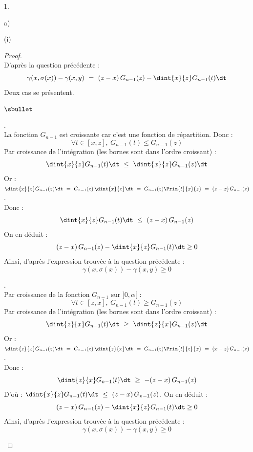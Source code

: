 \documentclass[11pt]{article}%
\begin{document}
\begin{noliste}{1.}
\begin{noliste}{a)}
\begin{nonoliste}{(i)}
      \begin{proof}~\\
      D'après la question précédente :
      \[
        \gamma(x, \sigma(x)) - \gamma(x,y) \ = \
        (z-x) \, G_{n-1}(z) - \dint{x}{z} G_{n-1}(t) \dt
      \]
      Deux cas se présentent.
        \begin{noliste}{$\sbullet$}
	  \item {}.\\
	  La fonction $G_{n-1}$ est croissante car c'est une fonction
	  de répartition. Donc :
	  \[
	    \forall t \in [x,z], \ G_{n-1}(t) \leq G_{n-1}(z)
	  \]
	  Par croissance de l'intégration (les bornes sont 
	  dans l'ordre croissant) :
	  \[
	    \dint{x}{z} G_{n-1}(t) \dt \ \leq \ 
	    \dint{x}{z} G_{n-1}(z) \dt
	  \]
	  Or : $\dint{x}{z} G_{n-1}(z) \dt \ = \ G_{n-1}(z) \,
	  \dint{x}{z} \dt \ = \ G_{n-1}(z) \Prim{t}{x}{z} \ = \
	  (z-x) \, G_{n-1}(z)$.\\[.1cm]
	  Donc : 
	  \[
	    \dint{x}{z} G_{n-1}(t) \dt \ \leq \ (z-x) \, G_{n-1}(z)
	  \]
	  On en déduit :
	  \[
	    (z-x) \, G_{n-1}(z) - \dint{x}{z} G_{n-1}(t) \dt \geq 0
	  \]
	  Ainsi, d'après l'expression trouvée à la question 
	  précédente :
	  \[
	    \gamma(x, \sigma(x)) - \gamma(x,y) \geq 0
	  \]
	  
	  \item {}.\\
	  Par croissance de la fonction $G_{n-1}$ sur $]0,\alpha[$ :
	  \[
	    \forall t \in [z,x], \ G_{n-1}(t) \geq G_{n-1}(z)
	  \]
	  Par croissance de l'intégration (les bornes sont 
	  dans l'ordre croissant) :
	  \[
	    \dint{z}{x} G_{n-1}(t) \dt \ \geq \ 
	    \dint{z}{x} G_{n-1}(z) \dt
	  \]
	  Or : $\dint{z}{x} G_{n-1}(z) \dt \ = \ G_{n-1}(z) \,
	  \dint{z}{x} \dt \ = \ G_{n-1}(z) \Prim{t}{z}{x} \ = \
	  (x-z) \, G_{n-1}(z)$.\\[.1cm]
	  Donc : 
	  \[
	    \dint{z}{x} G_{n-1}(t) \dt \ \geq \ -(z-x) \, G_{n-1}(z)
	  \]
	  D'où : $\dint{x}{z} G_{n-1}(t) \dt \ \leq \ (z-x) \, 
	  G_{n-1}(z)$.
	  On en déduit :
	  \[
	    (z-x) \, G_{n-1}(z) - \dint{x}{z} G_{n-1}(t) \dt \geq 0
	  \]
	  Ainsi, d'après l'expression trouvée à la question 
	  précédente :
	  \[
	    \gamma(x, \sigma(x)) - \gamma(x,y) \geq 0
	  \]
        \end{noliste}
        \conc{Finalement : $\forall (x,y) \in \ ]0,\alpha[ \, \times \,
        ]0,\beta[$, $\gamma(x, \sigma(x)) - \gamma(x,y) \geq 0$.}
        
        
        

\end{proof}
\end{nonoliste}
\end{noliste}
\end{noliste}
\end{document}
